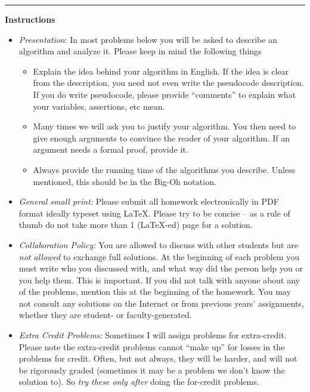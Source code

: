 \hrule height 1pt
\noindent

\begin{center}
	{\Large \bf Instructions}
\end{center}
\begin{itemize}
	\item {\em Presentation}:
	In most problems below you will be asked to describe an algorithm and analyze it. Please keep in mind the following things
	\begin{itemize}[noitemsep]
		\item 
		Explain the idea behind your algorithm in English. 
		If the idea is clear from the description, you need not even write the pseudocode description. If you do write pseudocode, please provide ``comments'' to explain what your variables, assertions, etc mean.
		
		\item 
		Many times we will ask you to justify your algorithm. You then need to give enough arguments to convince the reader of your algorithm.
		If an argument needs a formal proof, provide it.
		
		\item Always provide the running time of the algorithms you describe. Unless mentioned, this should be in the Big-Oh notation.
	\end{itemize}
	

\item {\em General small print:} Please submit all homework electronically in PDF format ideally typeset using LaTeX. 
Please try to be concise -- as a rule of thumb do not take more than 1 (LaTeX-ed) page for a solution. 


\item {\em Collaboration Policy:} You are allowed to discuss with other students but are {\em not allowed} to exchange full solutions.
At the beginning of each problem you must write who you discussed with, and what way did the person help you or you help them. This is important. 
If you did not talk with anyone about any of the problems, mention this at the beginning of the homework. You may not consult any solutions on the Internet or from previous years' assignments, whether they are student- or faculty-generated.


\item {\em Extra Credit Problems:} Sometimes I will assign problems for extra-credit. 
Please note the extra-credit problems cannot ``make up'' for losses in the problems for credit.
Often, but not always, they will be harder, and will not be rigorously graded (sometimes it may be a problem we don't 
know the solution to). So {\em try these only after} doing the for-credit problems.

\end{itemize}	

\announce{}
\thispagestyle{empty}
\newpage
\setcounter{page}{1}